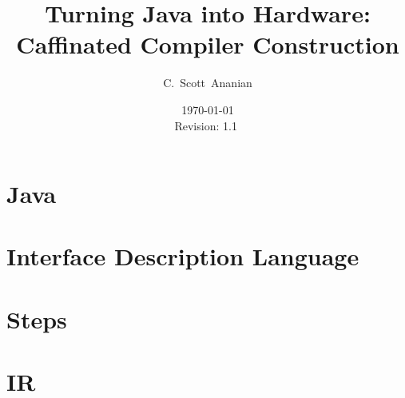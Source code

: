 \documentclass[10pt,notitlepage]{article}
\author{C.~Scott~Ananian}
\title{Turning Java into Hardware: \\ Caffinated Compiler Construction}
\date{\today \\ $ $Revision: 1.1 $ $}
\begin{document}

\maketitle

\section{Java}


\section{Interface Description Language}

\section{Steps}

\section{IR}

\nocite{*}

\end{document}
